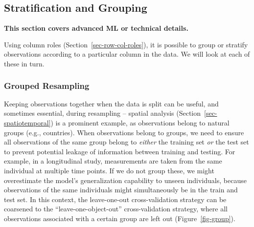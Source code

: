 \hypertarget{sec-strat-group}{%
\subsection{Stratification and Grouping}\label{sec-strat-group}}

\begin{tcolorbox}[enhanced jigsaw, colframe=quarto-callout-note-color-frame, rightrule=.15mm, bottomrule=.15mm, toprule=.15mm, opacityback=0, colback=white, left=2mm, arc=.35mm, breakable, leftrule=.75mm]
\begin{minipage}[t]{5.5mm}
\textcolor{quarto-callout-note-color}{\faInfo}
\end{minipage}%
\begin{minipage}[t]{\textwidth - 5.5mm}

\textbf{This section covers advanced ML or technical
details.}\vspace{2mm}

\end{minipage}%
\end{tcolorbox}

Using column roles (Section~\ref{sec-row-col-roles}), it is possible to
group or stratify observations according to a particular column in the
data. We will look at each of these in turn.

\hypertarget{grouped-resampling}{%
\subsubsection*{\texorpdfstring{Grouped
Resampling}{Grouped Resampling}}\label{grouped-resampling}}

Keeping observations together when the data is split can be useful, and
sometimes essential, during resampling -- spatial analysis
(Section~\ref{sec-spatiotemporal}) is a prominent example, as
observations belong to natural groups (e.g., countries). When
observations belong to groups, we need to ensure all observations of the
same group belong to \emph{either} the training set \emph{or} the test
set to prevent potential leakage of information between training and
testing. For example, in a longitudinal study, measurements are taken
from the same individual at multiple time points. If we do not group
these, we might overestimate the model's generalization capability to
unseen individuals, because observations of the same individuals might
simultaneously be in the train and test set. In this context, the
leave-one-out cross-validation strategy can be coarsened to the
``leave-one-object-out'' cross-validation strategy, where all
observations associated with a certain group are left out
(Figure~\ref{fig-group}).

